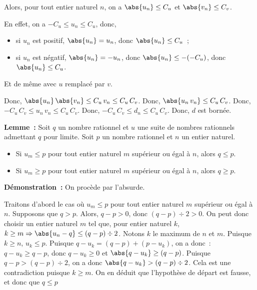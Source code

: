 \begin{itemize}[nosep]
            Alors, pour tout entier naturel $n$, on a $\abs{u_n} \leq C_u$ et $\abs{v_n} \leq C_v$.%
            \begin{foot}
                En effet, on a $-C_u \leq u_n \leq C_u$, donc,
                \begin{itemize}[nosep]
                    \item si $u_n$ est positif, $\abs{u_n} = u_n$, donc $\abs{u_n} \leq C_u$~;
                    \item si $u_n$ est négatif, $\abs{u_n} = -u_n$, donc $\abs{u_n} \leq -(-C_u)$, donc $\abs{u_n} \leq C_u$.
                \end{itemize}
                Et de même avec $u$ remplacé par $v$.
            \end{foot}
            Donc, $\abs{u_n} \, \abs{v_n} \leq C_u \, v_n \leq C_u \, C_v$.
            Donc, $\abs{u_n \, v_n} \leq C_u \, C_v$.
            Donc, $-C_u \, C_v \leq u_n \, v_n \leq C_u \, C_v$.
            Donc, $-C_u \, C_v \leq d_n \leq C_u \, C_v$.
            Donc, $d$ est bornée.
    \end{itemize}

    \done

\medskip

\noindent\textbf{Lemme :} Soit $q$ un nombre rationnel et $u$ une suite de nombres rationnels admettant $q$ pour limite.
    Soit $p$ un nombre rationnel et $n$ un entier naturel.
    \begin{itemize}[nosep]
        \item Si $u_m \leq p$ pour tout entier naturel $m$ supérieur ou égal à $n$, alors $q \leq p$.
        \item Si $u_m \geq p$ pour tout entier naturel $m$ supérieur ou égal à $n$, alors $q \geq p$.
    \end{itemize}

\medskip

\noindent\textbf{Démonstration :} On procède par l'absurde.
    
    Traitons d'abord le cas où $u_m \leq p$ pour tout entier naturel $m$ supérieur ou égal à $n$.
    Supposons que $q > p$. 
    Alors, $q - p > 0$, donc $(q - p) \div 2 > 0$. 
    On peut donc choisir un entier naturel $m$ tel que, pour entier naturel $k$, $k \geq m \Rightarrow \abs{u_n - q} \leq (q - p) \div 2$.
    Notons $k$ le maximum de $n$ et $m$. 
    Puisque $k \geq n$, $u_k \leq p$. 
    Puisque $q - u_k = (q - p) + (p - u_k)$, on a donc : $q - u_k \geq q - p$, donc $q - u_k \geq 0$ et $\abs{q - u_k} \geq (q - p)$.
    Puisque $q - p > (q - p) \div 2$, on a donc $\abs{q - u_k} > (q - p) \div 2$.
    Cela est une contradiction puisque $k \geq m$.
    On en déduit que l'hypothèse de départ est fausse, et donc que $q \leq p$

